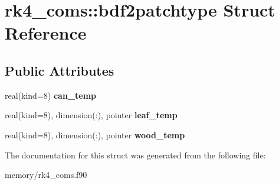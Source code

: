 \hypertarget{structrk4__coms_1_1bdf2patchtype}{
\section{rk4\_\-coms::bdf2patchtype Struct Reference}
\label{structrk4__coms_1_1bdf2patchtype}
}
\subsection*{Public Attributes}
\begin{DoxyCompactItemize}
\item 
\hypertarget{structrk4__coms_1_1bdf2patchtype_aec0aed9409122068c64242b3110a943d}{
real(kind=8) {\bfseries can\_\-temp}}
\label{structrk4__coms_1_1bdf2patchtype_aec0aed9409122068c64242b3110a943d}

\item 
\hypertarget{structrk4__coms_1_1bdf2patchtype_a8b0e5a1dc313bf8e07ae23b69bbdbe90}{
real(kind=8), dimension(:), pointer {\bfseries leaf\_\-temp}}
\label{structrk4__coms_1_1bdf2patchtype_a8b0e5a1dc313bf8e07ae23b69bbdbe90}

\item 
\hypertarget{structrk4__coms_1_1bdf2patchtype_a5fa9d6085b2912b58d563169ce78c9a6}{
real(kind=8), dimension(:), pointer {\bfseries wood\_\-temp}}
\label{structrk4__coms_1_1bdf2patchtype_a5fa9d6085b2912b58d563169ce78c9a6}

\end{DoxyCompactItemize}


The documentation for this struct was generated from the following file:\begin{DoxyCompactItemize}
\item 
memory/rk4\_\-coms.f90\end{DoxyCompactItemize}
